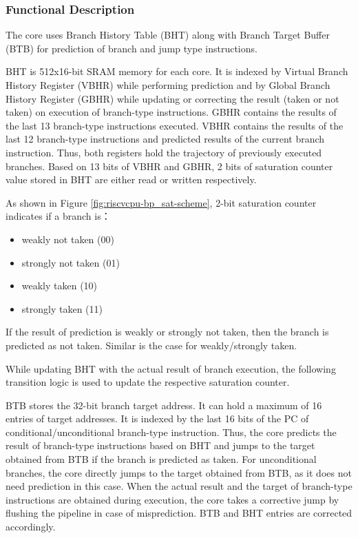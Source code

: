 \documentclass[main\_\_EN.tex]{subfiles}
\begin{document}
\subsubsection{Functional Description}
\label{sec:riscvcpu-perf-bp-func-descr}

The core uses Branch History Table (BHT) along with Branch Target Buffer (BTB) for prediction of branch and jump type instructions.

BHT is 512x16-bit SRAM memory for each core. It is indexed by Virtual Branch History Register (VBHR) while performing prediction and by Global Branch History Register (GBHR) while updating or correcting the result (taken or not taken) on execution of branch-type instructions. GBHR contains the results of the last 13 branch-type instructions executed. VBHR contains the results of the last 12 branch-type instructions and predicted results of the current branch instruction. Thus, both registers hold the trajectory of previously executed branches. Based on 13 bits of VBHR and GBHR, 2 bits of saturation counter value stored in BHT are either read or written respectively.

As shown in Figure \ref{fig:riscvcpu-bp_sat-scheme}, 2-bit saturation counter indicates if a branch is：

\begin{itemize}
    \item weakly not taken (00)
    \item strongly not taken (01)
    \item weakly taken (10)
    \item strongly taken (11)
\end{itemize}

If the result of prediction is weakly or strongly not taken, then the branch is predicted as not taken. Similar is the case for weakly/strongly taken.

While updating BHT with the actual result of branch execution, the following transition logic is used to update the respective saturation counter.

BTB stores the 32-bit branch target address. It can hold a maximum of 16 entries of target addresses. It is indexed by the last 16 bits of the PC of conditional/unconditional branch-type instruction. Thus, the core predicts the result of branch-type instructions based on BHT and jumps to the target obtained from BTB if the branch is predicted as taken. For unconditional branches, the core directly jumps to the target obtained from BTB, as it does not need prediction in this case. When the actual result and the target of branch-type instructions are obtained during execution, the core takes a corrective jump by flushing the pipeline in case of misprediction. BTB and BHT entries are corrected accordingly.
\end{document}
